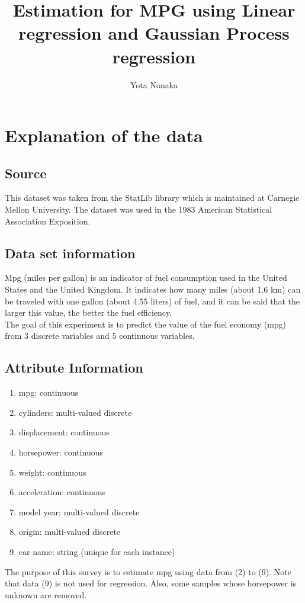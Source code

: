\documentclass{article}
\title{\vspace{-3.0cm}Estimation for MPG using Linear regression and Gaussian Process regression}
\author{Yota Nonaka}
\date{}
\begin{document}
\maketitle
\section{Explanation of the data}
\subsection{Source}
This dataset was taken from the StatLib library which is maintained at Carnegie Mellon University.\cite{uci}
The dataset was used in the 1983 American Statistical Association Exposition.
\subsection{Data set information}
Mpg (miles per gallon) is an indicator of fuel consumption used in the United States and the United Kingdom.
It indicates how many miles (about 1.6 km) can be traveled with one gallon (about 4.55 liters) of fuel, and it can be said that the larger this value, the better the fuel efficiency.\\
The goal of this experiment is to predict the value of the fuel economy (mpg) from $ 3 $ discrete variables and $ 5 $ continuous variables.

\subsection{Attribute Information}
\begin{enumerate}
\setlength{\parskip}{0cm}
\item mpg: continuous
\item cylinders: multi-valued discrete
\item displacement: continuous
\item horsepower: continuous
\item weight: continuous
\item acceleration: continuous
\item model year: multi-valued discrete
\item origin: multi-valued discrete
\item car name: string (unique for each instance)
\end{enumerate}

The purpose of this survey is to estimate mpg using data from (2) to (9).
Note that data (9) is not used for regression.
Also, some samples whose horsepower is unknown are removed.
\end{document}
